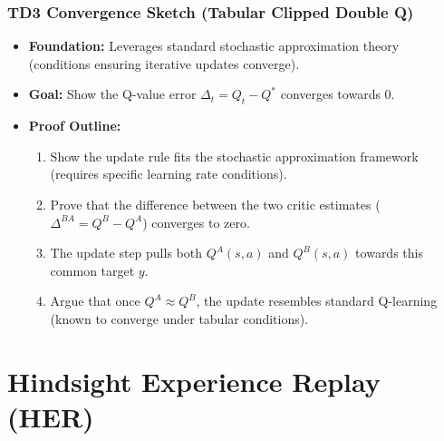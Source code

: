 \documentclass[9pt, aspectratio=169]{beamer}
\begin{document}
\begin{frame}
  \frametitle{TD3 Convergence Sketch (Tabular Clipped Double Q)}
    \begin{itemize}
        \item \textbf{Foundation:} Leverages standard stochastic approximation theory (conditions ensuring iterative updates converge).

        \item \textbf{Goal:} Show the Q-value error $\Delta_t = Q_t - Q^*$ converges towards 0.

        \item \textbf{Proof Outline:}
        \begin{enumerate}
            \item Show the update rule fits the stochastic approximation framework (requires specific learning rate conditions).
            \item Prove that the difference between the two critic estimates ($\Delta^{BA} = Q^B - Q^A$) converges to zero. 
            \item The update step pulls both $Q^A(s,a)$ and $Q^B(s,a)$ towards this common target $y$.
            \item Argue that once $Q^A \approx Q^B$, the update resembles standard Q-learning (known to converge under tabular conditions).
        \end{enumerate}
    \end{itemize}
\end{frame}


\section{Hindsight Experience Replay (HER)}
\end{document}
